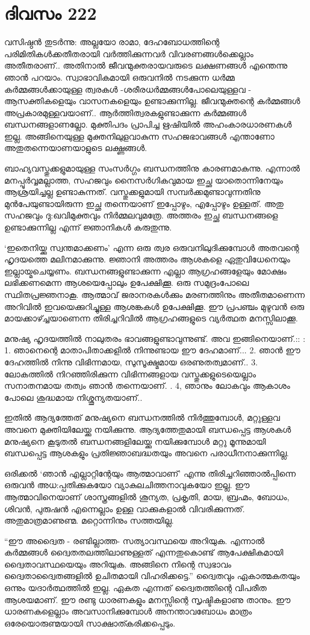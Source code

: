 \section{ദിവസം 222}


വസിഷ്ഠൻ തുടർന്നു: അല്ലയോ രാമാ, ദേഹബോധത്തിന്റെ പരിമിതികൾക്കതീതരായി വർത്തിക്കുന്നവർ വിവരണങ്ങള്‍ക്കെല്ലാം അതീതരാണ്‌.. അതിനാൽ ജീവന്മുക്തരായവരുടെ ലക്ഷണങ്ങൾ എന്തെന്നു ഞാൻ പറയാം. സ്വാഭാവികമായി ഒരുവനിൽ നടക്കുന്ന ധർമ്മ കർമ്മങ്ങൾക്കായുള്ള ത്വരകള്‍ -ശരീരധർമ്മങ്ങൾപോലെയുള്ളവ - ആസക്തികളെയും വാസനകളെയും ഉണ്ടാക്കുന്നില്ല. ജീവന്മുക്തന്റെ കർമ്മങ്ങൾ അപ്രകാരമുള്ളവയാണ്‌.. ആർത്തിത്വരകളുണ്ടാക്കുന്ന കർമ്മങ്ങൾ ബന്ധനങ്ങളാണല്ലോ. മുക്തിപദം പ്രാപിച്ച ഋഷിയിൽ അഹംകാരധാരണകൾ ഇല്ല. അങ്ങിനെയുള്ള മുക്തനിലുളവാകുന്ന സഹജഭാവങ്ങൾ എന്താണോ അതുതന്നെയാണയാളുടെ ലക്ഷ്ണങ്ങൾ.

ബാഹ്യവസ്തുക്കളുമായുള്ള സംസർഗ്ഗം ബന്ധനത്തിനു കാരണമാകുന്നു. എന്നാൽ മനപ്പൂർവ്വമല്ലാത്ത, സഹജവും നൈസര്‍ഗികവുമായ ഇച്ഛ യാതൊന്നിനേയും ആശ്രയിച്ചല്ല ഉണ്ടാകുന്നത്. വസ്തുക്കളുമായി സമ്പർക്കമുണ്ടാവുന്നതിനു മുൻപേയുണ്ടായിരുന്ന ഇച്ഛ തന്നെയാണ്‌ ഇപ്പോഴും, എപ്പോഴും ഉള്ളത്. അതു സഹജവും ദു:ഖവിമുക്തവും നിർമ്മലവുമത്രേ. അത്തരം ഇച്ഛ ബന്ധനങ്ങളെ ഉണ്ടാക്കുന്നില്ല എന്ന് ജ്ഞാനികൾ കരുതുന്നു.

‘ഇതെനിയ്ക്കു സ്വന്തമാക്കണം’ എന്ന ഒരു ത്വര ഒരുവനിലുദിക്കുമ്പോൾ അതവന്റെ ഹൃദയത്തെ മലിനമാക്കുന്നു. ജ്ഞാനി അത്തരം ആശകളെ ഏതുവിധേനെയും ഇല്ലായ്മചെയ്യണം. ബന്ധനങ്ങളുണ്ടാക്കുന്ന എല്ലാ ആഗ്രഹങ്ങളേയും മോക്ഷം ലഭിക്കണമെന്ന ആശയെപ്പോലും ഉപേക്ഷിക്കൂ. ഒരു സമുദ്രംപോലെ സ്ഥിതപ്രജ്ഞനാകൂ. ആത്മാവ് ജരാനരകൾക്കും മരണത്തിനും അതീതമാണെന്ന അറിവിൽ ഇവയെക്കുറിച്ചുള്ള ആശങ്കകൾ ഉപേക്ഷിക്കൂ. ഈ പ്രപഞ്ചം മുഴുവൻ ഒരു മായക്കാഴ്ച്ചയാണെന്ന തിരിച്ചറിവിൽ ആഗ്രഹങ്ങളുടെ വ്യർത്ഥത മനസ്സിലാക്കൂ.

മനുഷ്യ ഹൃദയത്തിൽ നാലുതരം ഭാവങ്ങളുണ്ടാവുന്നുണ്ട്. അവ ഇങ്ങിനെയാണ്‌.:: :
1. ഞാനെന്റെ മാതാപിതാക്കളിൽ നിന്നുണ്ടായ ഈ ദേഹമാണ്‌...
2. ഞാൻ ഈ ദേഹത്തിൽ നിന്നു വിഭിന്നമായ, സുസൂക്ഷ്മമായ ഒരണുതത്വമാണ്‌..
3. ലോകത്തിൽ നിറഞ്ഞിരിക്കുന്ന വിഭിന്നങ്ങളായ വസ്തുക്കളുടെയെല്ലാം സനാതനമായ തത്വം ഞാൻ തന്നെയാണ്‌. .
4, ഞാനും ലോകവും ആകാശം പോലെ ശുദ്ധമായ നിശ്ശൂന്യതയാണ്‌..

ഇതിൽ ആദ്യത്തേത് മനുഷ്യനെ ബന്ധനത്തിൽ നിർത്തുമ്പോൾ, മറ്റുള്ളവ അവനെ മുക്തിയിലേയ്ക്കു നയിക്കുന്നു. ആദ്യത്തേതുമായി ബന്ധപ്പെട്ട ആശകൾ മനുഷ്യനെ കൂടുതൽ ബന്ധനങ്ങളിലേയ്ക്കു നയിക്കുമ്പോള്‍ മറ്റു മൂന്നുമായി ബന്ധപ്പെട്ട ആശകളും പ്രതിജ്ഞാബദ്ധതയും അവനെ പരാധീനനാക്കുന്നില്ല.

ഒരിക്കൽ ‘ഞാൻ എല്ലാറ്റിന്റേയും ആത്മാവാണ്‌’ എന്നു തിരിച്ചറിഞ്ഞാൽപ്പിന്നെ ഒരുവൻ അധ:പ്പതിക്കുകയോ വ്യാകുലചിത്തനാവുകയോ ഇല്ല. ഈ ആത്മാവിനെയാണ്‌ ശാസ്ത്രങ്ങളിൽ ശൂന്യത, പ്രകൃതി, മായ, ബ്രഹ്മം, ബോധം, ശിവൻ, പുരുഷൻ എന്നെല്ലാം ഉള്ള വാക്കുകളാൽ വിവരിക്കുന്നത്. അതുമാത്രമാണുണ്മ. മറ്റൊന്നിനും സത്തയില്ല.

“ഈ അദ്വൈത - രണ്ടില്ലാത്ത- സത്യാവസ്ഥയെ അറിയുക. എന്നാൽ കർമ്മങ്ങള്‍ ദ്വൈതതലത്തിലാണുള്ളത് എന്നതുകൊണ്ട് ആപേക്ഷികമായി ദ്വൈതാവസ്ഥയെയും അറിയുക. അങ്ങിനെ നിന്റെ സ്വഭാവം ദ്വൈതാദ്വൈതങ്ങളിൽ ഉചിതമായി വിഹരിക്കട്ടെ.” ദ്വൈതവും ഏകാത്മകതയും ഒന്നും യദാർത്ഥത്തിൽ ഇല്ല. ഏകത എന്നത് ദ്വൈതത്തിന്റെ വിപരീത ആശയമാണ്‌. ഈ രണ്ടു ധാരണകളും മനസ്സിന്റെ സൃഷ്ടികളാണു താനും. ഈ ധാരണകളെല്ലാം അവസാനിക്കുമ്പോൾ അനന്താവബോധം മാത്രം ഒരേയൊരുണ്മയായി സാക്ഷാത്കരിക്കപ്പെടും. 
